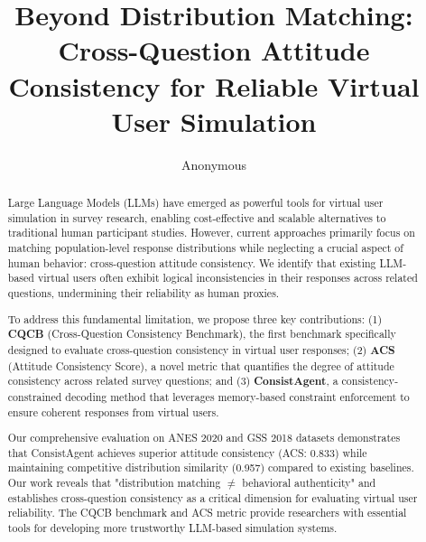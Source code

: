 \documentclass[sigconf, anonymous]{acmart}
\begin{document}
\title{Beyond Distribution Matching: Cross-Question Attitude Consistency for Reliable Virtual User Simulation}

\author{Anonymous}

\begin{abstract}
Large Language Models (LLMs) have emerged as powerful tools for virtual user simulation in survey research, enabling cost-effective and scalable alternatives to traditional human participant studies. However, current approaches primarily focus on matching population-level response distributions while neglecting a crucial aspect of human behavior: cross-question attitude consistency. We identify that existing LLM-based virtual users often exhibit logical inconsistencies in their responses across related questions, undermining their reliability as human proxies.

To address this fundamental limitation, we propose three key contributions: (1) \textbf{CQCB} (Cross-Question Consistency Benchmark), the first benchmark specifically designed to evaluate cross-question consistency in virtual user responses; (2) \textbf{ACS} (Attitude Consistency Score), a novel metric that quantifies the degree of attitude consistency across related survey questions; and (3) \textbf{ConsistAgent}, a consistency-constrained decoding method that leverages memory-based constraint enforcement to ensure coherent responses from virtual users.

Our comprehensive evaluation on ANES 2020 and GSS 2018 datasets demonstrates that ConsistAgent achieves superior attitude consistency (ACS: 0.833) while maintaining competitive distribution similarity (0.957) compared to existing baselines. Our work reveals that "distribution matching $\neq$ behavioral authenticity" and establishes cross-question consistency as a critical dimension for evaluating virtual user reliability. The CQCB benchmark and ACS metric provide researchers with essential tools for developing more trustworthy LLM-based simulation systems.
\end{abstract}


\maketitle
\end{document}
